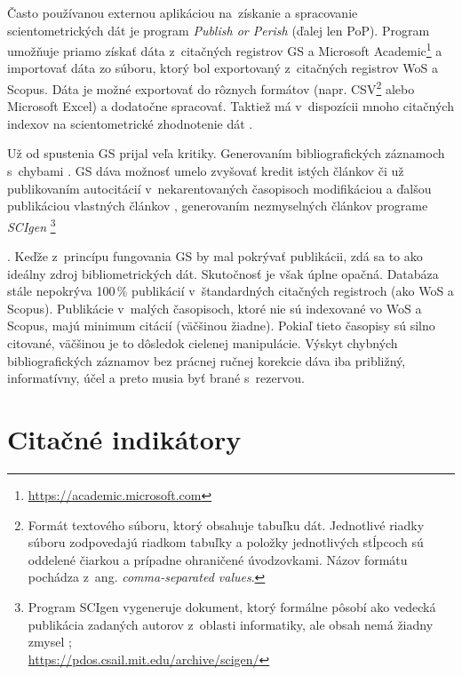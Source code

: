 Často používanou externou aplikáciou na~získanie a spracovanie scientometrických
dát je program \emph{Publish or Perish} (ďalej
len PoP).  Program umožňuje priamo získať dáta z~citačných registrov GS a
Microsoft Academic\footnote{\url{https://academic.microsoft.com}} a importovať
dáta zo súboru, ktorý bol exportovaný z~citačných registrov WoS a Scopus.  Dáta
je možné exportovať do rôznych formátov (napr. CSV\footnote{Formát textového
súboru, ktorý obsahuje tabuľku dát. Jednotlivé riadky súboru zodpovedajú
riadkom tabuľky a položky jednotlivých stĺpcoch sú oddelené čiarkou a prípadne
ohraničené úvodzovkami.  Názov formátu pochádza z~ang. \emph{comma-separated
values}.} alebo Microsoft Excel) a dodatočne spracovať. Taktiež má
v~dispozícii mnoho citačných indexov na scientometrické zhodnotenie dát
\citep{Harzing2011}.

Už od spustenia GS prijal veľa kritiky.  Generovaním bibliografických záznamoch
s~chybami \citep{Jacso2009,Jacso2010}.  GS dáva možnosť umelo zvyšovať kredit
istých článkov či už publikovaním autocitácií v~nekarentovaných časopisoch
modifikáciou a ďalšou publikáciou vlastných článkov \citep{Beel2010b},
generovaním nezmyselných článkov programe \emph{SCIgen}
\footnote{Program SCIgen vygeneruje dokument, ktorý formálne pôsobí ako
vedecká publikácia zadaných autorov z~oblasti informatiky, ale obsah nemá
žiadny zmysel \citep{Labbe2013};\\\url{https://pdos.csail.mit.edu/archive/scigen/}}

\citep{Beel2010a}.
Keďže z~princípu fungovania GS by mal pokrývať publikácii, zdá sa to ako
ideálny zdroj bibliometrických dát.  Skutočnosť je však úplne opačná. Databáza
stále nepokrýva 100\,\% publikácií v~štandardných citačných registroch (ako WoS
a Scopus). Publikácie v~malých časopisoch, ktoré nie sú indexované vo WoS a Scopus,
majú minimum citácií (väčšinou žiadne). Pokiaľ tieto časopisy sú silno citované,
väčšinou je to dôsledok cielenej manipulácie.  Výskyt chybných bibliografických
záznamov bez prácnej ručnej korekcie dáva iba približný, informatívny, účel a
preto musia byť brané s~rezervou.


\section{Citačné indikátory}
\label{sec:indicators}

